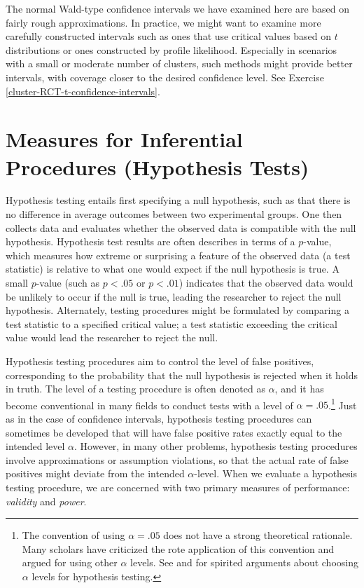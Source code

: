 \documentclass[
]{book}
\begin{document}
The normal Wald-type confidence intervals we have examined here are based on fairly rough approximations.
In practice, we might want to examine more carefully constructed intervals such as ones that use critical values based on \(t\) distributions or ones constructed by profile likelihood.
Especially in scenarios with a small or moderate number of clusters, such methods might provide better intervals, with coverage closer to the desired confidence level.
See Exercise \ref{cluster-RCT-t-confidence-intervals}.

\section{Measures for Inferential Procedures (Hypothesis Tests)}\label{assessing-inferential-procedures}

Hypothesis testing entails first specifying a null hypothesis, such as that there is no difference in average outcomes between two experimental groups. One then collects data and evaluates whether the observed data is compatible with the null hypothesis.
Hypothesis test results are often describes in terms of a \(p\)-value, which measures how extreme or surprising a feature of the observed data (a test statistic) is relative to what one would expect if the null hypothesis is true.
A small \(p\)-value (such as \(p < .05\) or \(p < .01\)) indicates that the observed data would be unlikely to occur if the null is true, leading the researcher to reject the null hypothesis.
Alternately, testing procedures might be formulated by comparing a test statistic to a specified critical value; a test statistic exceeding the critical value would lead the researcher to reject the null.

Hypothesis testing procedures aim to control the level of false positives, corresponding to the probability that the null hypothesis is rejected when it holds in truth.
The level of a testing procedure is often denoted as \(\alpha\), and it has become conventional in many fields to conduct tests with a level of \(\alpha = .05\).\footnote{The convention of using \(\alpha = .05\) does not have a strong theoretical rationale. Many scholars have criticized the rote application of this convention and argued for using other \(\alpha\) levels. See \citet{Benjamin2017redefine} and \citet{Lakens2018justify} for spirited arguments about choosing \(\alpha\) levels for hypothesis testing.}
Just as in the case of confidence intervals, hypothesis testing procedures can sometimes be developed that will have false positive rates exactly equal to the intended level \(\alpha\).
However, in many other problems, hypothesis testing procedures involve approximations or assumption violations, so that the actual rate of false positives might deviate from the intended \(\alpha\)-level.
When we evaluate a hypothesis testing procedure, we are concerned with two primary measures of performance: \emph{validity} and \emph{power}.
\end{document}
